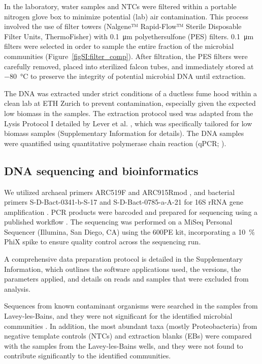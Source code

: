 In the laboratory, water samples and NTCs were filtered within a portable nitrogen glove box to minimize potential (lab) air contamination.
This process involved the use of filter towers (Nalgene™ Rapid-Flow™ Sterile Disposable Filter Units, ThermoFisher) with \SI{0.1}{\micro\metre} polyethersulfone (PES) filters.
\SI{0.1}{\micro\metre} filters were selected in order to sample the entire fraction of the microbial communities (Figure~\ref{figSI:filter_comp}).
After filtration, the PES filters were carefully removed, placed into sterilized falcon tubes, and immediately stored at \SI{-80}{\celsius} to preserve the integrity of potential microbial DNA until extraction.

The DNA was extracted under strict conditions of a ductless fume hood within a clean lab at ETH Zurich to prevent contamination, especially given the expected low biomass in the samples.
The extraction protocol used was adapted from the Lysis Protocol I detailed by Lever et al. \citep{lever2015modular}, which was specifically tailored for low biomass samples (Supplementary Information for details).
The DNA samples were quantified using quantitative polymerase chain reaction (qPCR; \cite{lever2015modular, deng2022qpcr, meier2024qpcr}).

\subsection{DNA sequencing and bioinformatics}
We utilized archaeal primers ARC519F and ARC915Rmod \citep{soerensen2006stratified, cadillo2006vertical}, and bacterial primers S-D-Bact-0341-b-S-17 and S-D-Bact-0785-a-A-21 for 16S rRNA gene amplification \citep{herlemann2011trasitions}.
PCR products were barcoded and prepared for sequencing using a published workflow \citep{han2020eutrophication}. 
The sequencing was performed on a MiSeq Personal Sequencer (Illumina, San Diego, CA) using the 600PE kit, incorporating a \SI{10}{\percent} PhiX spike to ensure quality control across the sequencing run.

A comprehensive data preparation protocol is detailed in the Supplementary Information, which outlines the software applications used, the versions, the parameters applied, and details on reads and samples that were excluded from analysis.

Sequences from known contaminant organisms were searched in the samples from Lavey-les-Bains, and they were not significant for the identified microbial communities \citep{salter2014reagent, sheik2018identification}.
In addition, the most abundant taxa (mostly Proteobacteria) from negative template controls (NTCs) and extraction blanks (EBs) were compared with the samples from the Lavey-les-Bains wells, and they were not found to contribute significantly to the identified communities.

